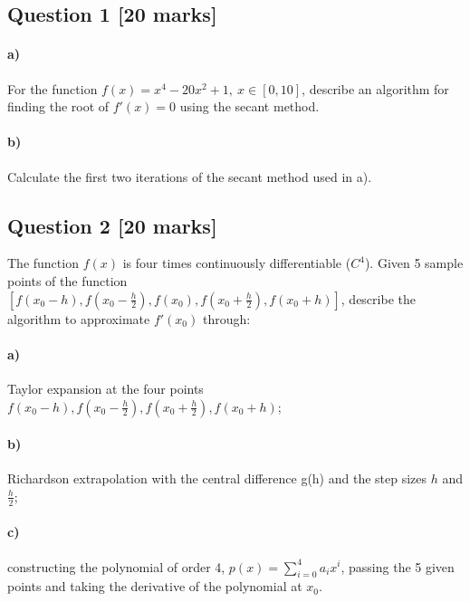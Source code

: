 \documentclass[11pt,a4paper,hidelinks,fleqn]{article}            %
\date{}
\begin{document}
\subsection*{Question 1 [20 marks]}

\paragraph{a)} For the function $f(x) = x^4 - 20 x^2 + 1, ~x\in[0, 10]$,
describe an algorithm for finding the root of $f'(x) = 0$ using the secant method.

\paragraph{b)} Calculate the first two iterations of the secant method used in a).

\subsection*{Question 2 [20 marks]} 

The function $f(x)$ is four times continuously differentiable ($C^4$).
Given 5 sample points of the function $[f(x_0-h), f(x_0-\frac{h}{2}), f(x_0), f(x_0+\frac{h}{2}), f(x_0+h)]$,
describe the algorithm to approximate $f'(x_0)$ through:

\paragraph{a)} Taylor expansion at the four points $f(x_0-h), f(x_0-\frac{h}{2}), f(x_0+\frac{h}{2}), f(x_0+h)$;

\paragraph{b)} Richardson extrapolation with the central difference g(h) and the step sizes $h$ and $\displaystyle \frac{h}{2}$; 

\paragraph{c)} constructing the polynomial of order 4, $p(x) = \sum_{i=0}^4 a_i x^i$, passing the 5 given points and taking the derivative of the polynomial at $x_0$.
\end{document}
